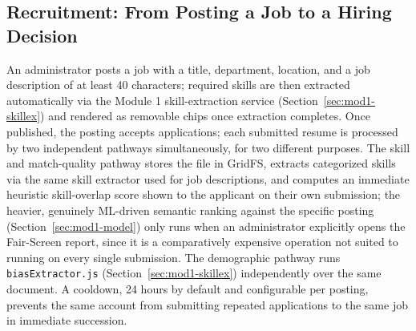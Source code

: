 \documentclass[11pt,a4paper]{article}
\newcommand{\code}[1]{\texttt{\footnotesize #1}}
\begin{document}
\subsection{Recruitment: From Posting a Job to a Hiring Decision}

An administrator posts a job with a title, department, location, and a job description of at least 40 characters; required skills are then extracted automatically via the Module 1 skill-extraction service (Section~\ref{sec:mod1-skillex}) and rendered as removable chips once extraction completes. Once published, the posting accepts applications; each submitted resume is processed by two independent pathways simultaneously, for two different purposes. The skill and match-quality pathway stores the file in GridFS, extracts categorized skills via the same skill extractor used for job descriptions, and computes an immediate heuristic skill-overlap score shown to the applicant on their own submission; the heavier, genuinely ML-driven semantic ranking against the specific posting (Section~\ref{sec:mod1-model}) only runs when an administrator explicitly opens the Fair-Screen report, since it is a comparatively expensive operation not suited to running on every single submission. The demographic pathway runs \code{biasExtractor.js} (Section~\ref{sec:mod1-skillex}) independently over the same document. A cooldown, 24 hours by default and configurable per posting, prevents the same account from submitting repeated applications to the same job in immediate succession.
\end{document}
